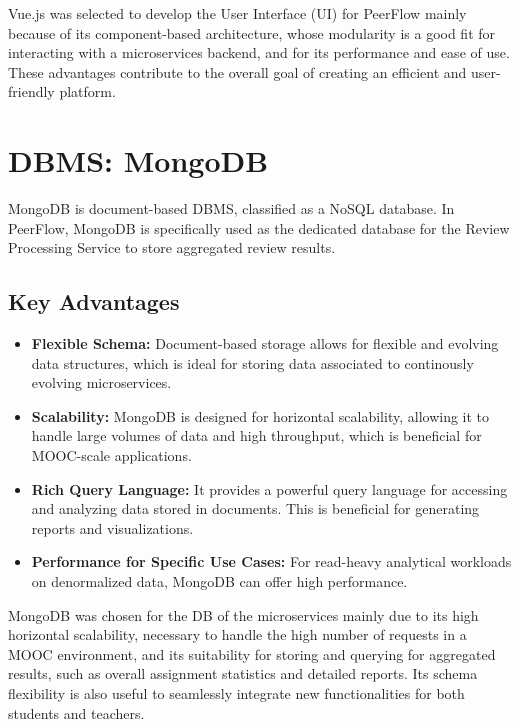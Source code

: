 \begin{justify}
Vue.js was selected to develop the User Interface (UI) for PeerFlow mainly because of its component-based architecture, whose modularity is a good fit for interacting with a microservices backend, and for its performance and ease of use. These advantages contribute to the overall goal of creating an efficient and user-friendly platform.
\end{justify}

\section{DBMS: MongoDB}

\begin{justify}
MongoDB is document-based DBMS, classified as a NoSQL database. In PeerFlow, MongoDB is specifically used as the dedicated database for the Review Processing Service to store aggregated review results.
\end{justify}

\subsection{Key Advantages}

\begin{itemize}
\item \textbf{Flexible Schema:} Document-based storage allows for flexible and evolving data structures, which is ideal for storing data associated to continously evolving microservices.
\item \textbf{Scalability:} MongoDB is designed for horizontal scalability, allowing it to handle large volumes of data and high throughput, which is beneficial for MOOC-scale applications.
\item \textbf{Rich Query Language:} It provides a powerful query language for accessing and analyzing data stored in documents. This is beneficial for generating reports and visualizations.
\item \textbf{Performance for Specific Use Cases:} For read-heavy analytical workloads on denormalized data, MongoDB can offer high performance.
\end{itemize}

\begin{justify}
MongoDB was chosen for the DB of the microservices mainly due to its high horizontal scalability, necessary to handle the high number of requests in a MOOC environment, and its suitability for storing and querying for aggregated results, such as overall assignment statistics and detailed reports. Its schema flexibility is also useful to seamlessly integrate new functionalities for both students and teachers.
\end{justify}

